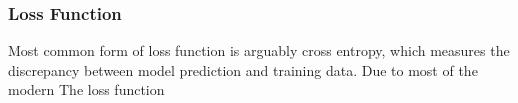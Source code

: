 \subsubsection{Loss Function}

Most common form of loss function is arguably cross entropy, which measures the discrepancy between model prediction and training data. Due to most of the modern The loss function 